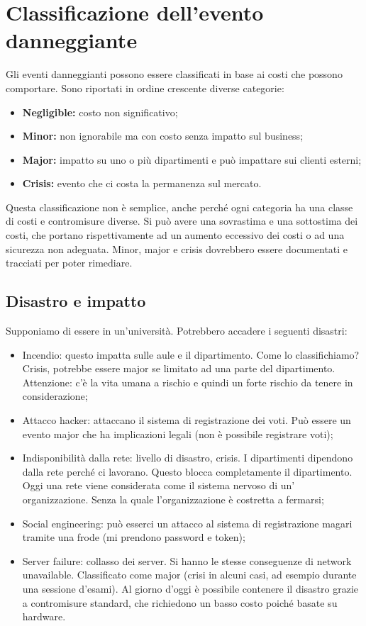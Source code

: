 \section{Classificazione dell'evento danneggiante}

Gli eventi danneggianti possono essere classificati in base ai costi
che possono comportare. Sono riportati in ordine crescente diverse categorie:

\begin{itemize}
\item \textbf{Negligible:} costo non significativo;
\item \textbf{Minor:} non ignorabile ma con costo senza impatto sul business;
\item \textbf{Major:} impatto su uno o più dipartimenti e può impattare sui
clienti esterni;
\item \textbf{Crisis:} evento che ci costa la permanenza sul mercato.
\end{itemize}

Questa classificazione non è semplice, anche perché ogni categoria ha una
classe di costi e contromisure diverse. Si può avere una sovrastima e una
sottostima dei costi, che portano rispettivamente ad un aumento eccessivo
dei costi o ad una sicurezza non adeguata.
Minor, major e crisis dovrebbero essere documentati e tracciati per poter
rimediare.

\subsection{Disastro e impatto}

Supponiamo di essere in un'università.
Potrebbero accadere i seguenti disastri:
\begin{itemize}
  \item Incendio: questo impatta sulle aule e il dipartimento. Come lo
  classifichiamo? Crisis, potrebbe essere major se limitato ad una parte del
  dipartimento. Attenzione: c'è la vita umana a rischio e quindi un forte
  rischio da tenere in considerazione;
  \item Attacco hacker: attaccano il sistema di registrazione dei voti. Può
  essere un evento major che ha implicazioni legali (non è possibile registrare
  voti);
  \item Indisponibilità dalla rete: livello di disastro, crisis. I dipartimenti
  dipendono dalla rete perché ci lavorano. Questo blocca completamente il
  dipartimento. Oggi una rete viene considerata come il sistema nervoso di un'
  organizzazione. Senza la quale l'organizzazione è costretta a fermarsi;
  \item Social engineering: può esserci un attacco al sistema di registrazione
  magari tramite una frode (mi prendono password e token);
  \item Server failure: collasso dei server. Si hanno le stesse conseguenze di
  network unavailable.
Classificato come major (crisi in alcuni casi, ad esempio durante una sessione
d'esami). Al giorno d'oggi è possibile contenere il disastro grazie a
contromisure standard, che richiedono un basso costo poiché basate su hardware.
\end{itemize}

